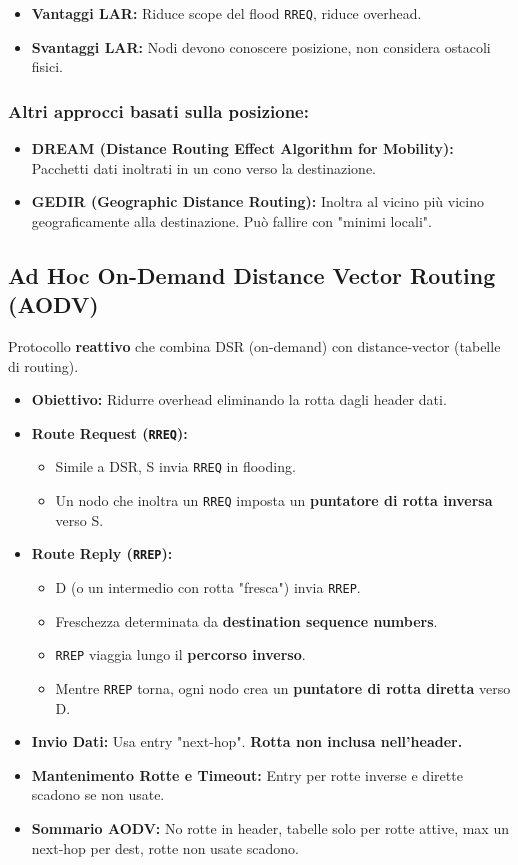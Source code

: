 \documentclass{article}
\begin{document}
\begin{itemize}
    \item \textbf{Vantaggi LAR:} Riduce scope del flood \texttt{RREQ}, riduce overhead.
    \item \textbf{Svantaggi LAR:} Nodi devono conoscere posizione, non considera ostacoli fisici.
\end{itemize}

\subsubsection{Altri approcci basati sulla posizione:}
\begin{itemize}
    \item \textbf{DREAM (Distance Routing Effect Algorithm for Mobility):} Pacchetti dati inoltrati in un cono verso la destinazione.
    \item \textbf{GEDIR (Geographic Distance Routing):} Inoltra al vicino più vicino geograficamente alla destinazione. Può fallire con "minimi locali".
\end{itemize}

\subsection{Ad Hoc On-Demand Distance Vector Routing (AODV)}
Protocollo \textbf{reattivo} che combina DSR (on-demand) con distance-vector (tabelle di routing).
\begin{itemize}
    \item \textbf{Obiettivo:} Ridurre overhead eliminando la rotta dagli header dati.
    \item \textbf{Route Request (\texttt{RREQ}):}
    \begin{itemize}
        \item Simile a DSR, S invia \texttt{RREQ} in flooding.
        \item Un nodo che inoltra un \texttt{RREQ} imposta un \textbf{puntatore di rotta inversa} verso S.
    \end{itemize}
    \item \textbf{Route Reply (\texttt{RREP}):}
    \begin{itemize}
        \item D (o un intermedio con rotta "fresca") invia \texttt{RREP}.
        \item Freschezza determinata da \textbf{destination sequence numbers}.
        \item \texttt{RREP} viaggia lungo il \textbf{percorso inverso}.
        \item Mentre \texttt{RREP} torna, ogni nodo crea un \textbf{puntatore di rotta diretta} verso D.
    \end{itemize}
    \item \textbf{Invio Dati:} Usa entry "next-hop". \textbf{Rotta non inclusa nell'header.}
    \item \textbf{Mantenimento Rotte e Timeout:} Entry per rotte inverse e dirette scadono se non usate.
    \item \textbf{Sommario AODV:} No rotte in header, tabelle solo per rotte attive, max un next-hop per dest, rotte non usate scadono.
\end{itemize}
\end{document}
